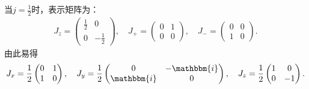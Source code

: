 \noindent  当$j=\frac{1}{2}$时，表示矩阵为：
\begin{align}
    J_z=\begin{pmatrix}
        \frac{1}{2} & 0 \\ 0 & -\frac{1}{2}
    \end{pmatrix},\quad
    J_{+}=\begin{pmatrix}
        0 & 1 \\ 0 & 0
    \end{pmatrix},\quad
    J_{-}=\begin{pmatrix}
        0 & 0 \\ 1 & 0
    \end{pmatrix}.
\end{align}
由此易得
\begin{align}
    J_{x}=\frac{1}{2}\begin{pmatrix}
        0 & 1 \\ 1 & 0
    \end{pmatrix},\quad
    J_{y}=\frac{1}{2}\begin{pmatrix}
        0 & -\mathbbm{i} \\ \mathbbm{i} & 0
    \end{pmatrix},\quad
    J_z=\frac{1}{2} \begin{pmatrix}
        1 & 0 \\ 0 & -1
    \end{pmatrix}.
\end{align}

